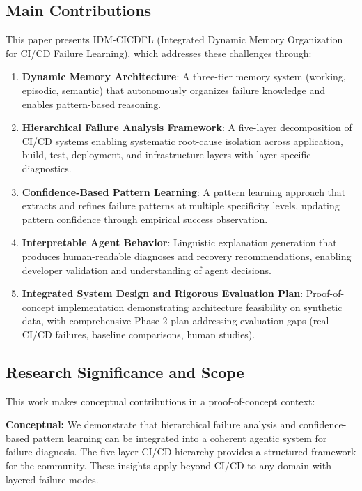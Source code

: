 \documentclass[11pt]{article}
\begin{document}
\subsection{Main Contributions}

This paper presents IDM-CICDFL (Integrated Dynamic Memory Organization for CI/CD Failure Learning), which addresses these challenges through:

\begin{enumerate}
    \item \textbf{Dynamic Memory Architecture}: A three-tier memory system (working, episodic, semantic) that autonomously organizes failure knowledge and enables pattern-based reasoning.

    \item \textbf{Hierarchical Failure Analysis Framework}: A five-layer decomposition of CI/CD systems enabling systematic root-cause isolation across application, build, test, deployment, and infrastructure layers with layer-specific diagnostics.

    \item \textbf{Confidence-Based Pattern Learning}: A pattern learning approach that extracts and refines failure patterns at multiple specificity levels, updating pattern confidence through empirical success observation.

    \item \textbf{Interpretable Agent Behavior}: Linguistic explanation generation that produces human-readable diagnoses and recovery recommendations, enabling developer validation and understanding of agent decisions.

    \item \textbf{Integrated System Design and Rigorous Evaluation Plan}: Proof-of-concept implementation demonstrating architecture feasibility on synthetic data, with comprehensive Phase 2 plan addressing evaluation gaps (real CI/CD failures, baseline comparisons, human studies).
\end{enumerate}

\subsection{Research Significance and Scope}

This work makes conceptual contributions in a proof-of-concept context:

\textbf{Conceptual:} We demonstrate that hierarchical failure analysis and confidence-based pattern learning can be integrated into a coherent agentic system for failure diagnosis. The five-layer CI/CD hierarchy provides a structured framework for the community. These insights apply beyond CI/CD to any domain with layered failure modes.
\end{document}
